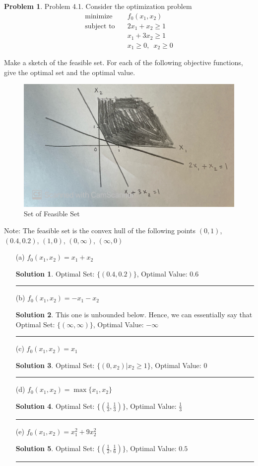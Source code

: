 \documentclass{article}
\theoremstyle{definition}
\newtheorem{problem}{Problem}
\def\fline{\rule{0.75\linewidth}{0.5pt}}
\newcommand{\finishline}{\begin{center}\fline\end{center}}
\newtheorem*{solution*}{Solution}
\newenvironment{solution}{\begin{solution*}}{{\finishline} \end{solution*}}
\begin{document}
\begin{problem}
    Problem 4.1. Consider the optimization problem 
    \begin{align*}
\text{minimize} \quad & f_0(x_1, x_2) \\
\text{subject to} \quad & 2x_1 + x_2 \geq 1\\
\quad & x_1 + 3x_2 \geq 1\\
& x_1 \geq 0, \enspace x_2 \geq 0
\end{align*}

Make a sketch of the feasible set. For each of the following objective functions, give the optimal set and the optimal value.

\begin{figure}[h!]
        \centering
        \includegraphics[width=0.6 \textwidth]{HW 8n_1.jpg}
        \caption{Set of Feasible Set}
    \end{figure}

Note: The feasible set is the convex hull of the following points $(0, 1)$, $(0.4, 0.2)$, $(1, 0)$, $(0, \infty)$, $(\infty, 0)$

\begin{itemize}
    \item[(a)] $f_0(x_1, x_2) = x_1 + x_2$
    \begin{solution}
        Optimal Set: $\{(0.4, 0.2)\}$, Optimal Value: $0.6$
    \end{solution}
    \item[(b)] $f_0(x_1, x_2) = - x_1 - x_2$
    \begin{solution}
        This one is unbounded below. Hence, we can essentially say that Optimal Set: $\{(\infty, \infty)\}$, Optimal Value: $-\infty$
    \end{solution}
    \item[(c)] $f_0(x_1, x_2) = x_1$  
    \begin{solution}
        Optimal Set: $\{(0, x_2) | x_2 \geq 1\}$, Optimal Value: $0$
    \end{solution}
    \item[(d)] $f_0(x_1, x_2) = \max\{x_1, x_2\}$
    \begin{solution}
        Optimal Set: $\{(\frac{1}{3}, \frac{1}{3})\}$, Optimal Value: $\frac{1}{3}$
    \end{solution}
    \item[(e)] $f_0(x_1, x_2) = x_1^2 + 9x_2^2$
    \begin{solution}
        Optimal Set: $\{(\frac{1}{2}, \frac{1}{6})\}$, Optimal Value: $0.5$
    \end{solution}
\end{itemize}
\end{problem}
\end{document}
